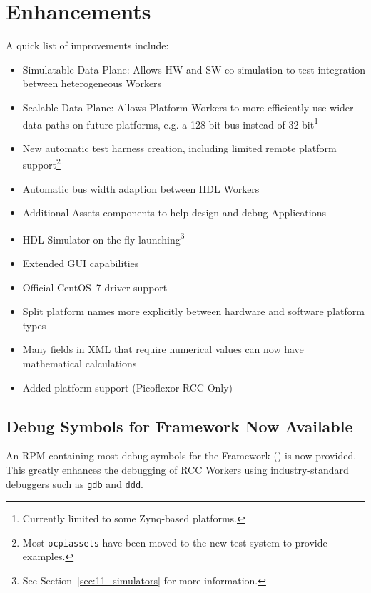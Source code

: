 
\newpage
{}
\def\ocpiversion{v1.1.0}  %
\section{Enhancements}
A quick list of improvements include:
\begin{itemize}
\setlength\itemsep{0em} %
\item Simulatable Data Plane: Allows HW and SW co-simulation to test
integration between heterogeneous Workers
\item Scalable Data Plane: Allows Platform Workers to more efficiently use wider data paths on future platforms, e.g. a 128-bit bus instead of 32-bit\footnote{Currently limited to some Zynq-based platforms.}
\item New automatic test harness creation, including limited remote platform support\footnote{Most \texttt{ocpiassets} have been moved to the new test system to provide examples.}
\item Automatic bus width adaption between HDL Workers
\item Additional Assets components to help design and debug Applications
\item HDL Simulator on-the-fly launching\footnote{See Section~\ref{sec:11_simulators} for more information.}
\item Extended GUI capabilities
\item Official CentOS~7 driver support
\item Split platform names more explicitly between hardware and software platform types
\item Many fields in XML that require numerical values can now have mathematical calculations %
\item Added platform support (Picoflexor RCC-Only)
\end{itemize}

\subsection{Debug Symbols for Framework Now Available}
An RPM containing most debug symbols for the Framework () is now provided. This greatly enhances the debugging of RCC Workers using industry-standard debuggers such as \texttt{gdb} and \texttt{ddd}.

